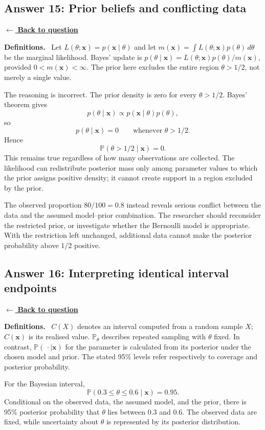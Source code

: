 \documentclass[11pt,a4paper]{article}
\newcommand{\given}{\mathrel{|}}
\newcommand{\xvec}{\boldsymbol{x}}
\newcommand{\answernav}[1]{%
  \label{answer:#1}%
  \noindent\hyperref[question:#1]{$\leftarrow$ \textbf{Back to question}}%
  \par\smallskip}
\newcommand{\studyheading}[1]{%
  \par\medskip\noindent\textcolor{statblue}{\textbf{#1.}}\ }
\begin{document}
\clearpage

\subsection{Answer 15: Prior beliefs and conflicting data}
\answernav{15}

\studyheading{Definitions}
Let $L(\theta;\xvec)=p(\xvec\given\theta)$ and let
$m(\xvec)=\int L(\theta;\xvec)p(\theta)\,d\theta$ be the marginal likelihood.
Bayes' update is $p(\theta\given\xvec)=L(\theta;\xvec)p(\theta)/m(\xvec)$, provided $0<m(\xvec)<\infty$.
The prior here excludes the entire region $\theta>1/2$, not merely a single value.

The reasoning is incorrect. The prior density is zero for every
$\theta>1/2$. Bayes' theorem gives
\[
p(\theta\mid\xvec)
\propto p(\xvec\mid\theta)p(\theta),
\]
so
\[
p(\theta\mid\xvec)=0
\qquad\text{whenever }\theta>1/2.
\]
Hence
\[
\boxed{
\mathbb{P}(\theta>1/2\mid\xvec)=0.
}
\]
This remains true regardless of how many observations are collected. The
likelihood can redistribute posterior mass only among parameter values to
which the prior assigns positive density; it cannot create support in a
region excluded by the prior.

The observed proportion $80/100=0.8$ instead reveals serious conflict between
the data and the assumed model--prior combination. The researcher should
reconsider the restricted prior, or investigate whether the Bernoulli model
is appropriate. With the restriction left unchanged, additional data cannot
make the posterior probability above $1/2$ positive.

\clearpage

\subsection{Answer 16: Interpreting identical interval endpoints}
\answernav{16}

\studyheading{Definitions}
$C(X)$ denotes an interval computed from a random sample $X$; $C(\xvec)$ is its realised value.
$\mathbb P_\theta$ describes repeated sampling with $\theta$ fixed.
In contrast, $\mathbb P(\,\cdot\mid\xvec)$ for the parameter is calculated from its posterior under the chosen model and prior.
The stated 95\% levels refer respectively to coverage and posterior probability.

For the Bayesian interval,
\[
\boxed{
\mathbb{P}(0.3\leq\theta\leq0.6\mid\xvec)=0.95.
}
\]
Conditional on the observed data, the assumed model, and the prior, there is
95\% posterior probability that $\theta$ lies between $0.3$ and $0.6$. The
observed data are fixed, while uncertainty about $\theta$ is represented by
its posterior distribution.
\end{document}
